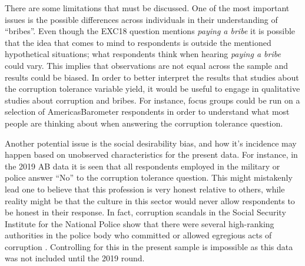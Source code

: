 \documentclass[12pt,a4]{article}\usepackage[]{graphicx}\usepackage[]{xcolor}
\begin{document}
There are some limitations that must be discussed. One of the most important issues is the possible differences across individuals in their understanding of \enquote{bribes}. Even though the EXC18 question mentions \textit{paying a bribe} it is possible that the idea that comes to mind to respondents is outside the mentioned hypothetical situations; what respondents think when hearing \textit{paying a bribe} could vary. This implies that observations are not equal across the sample and results could be biased. In order to better interpret the results that studies about the corruption tolerance variable yield, it would be useful to engage in qualitative studies about corruption and bribes. For instance, focus groups could be run on a selection of AmericasBarometer respondents in order to understand what most people are thinking about when answering the corruption tolerance question.

Another potential issue is the social desirability bias, and how it's incidence may happen based on unobserved characteristics for the present data. For instance, in the 2019 AB data it is seen that all respondents employed in the military or police answer \enquote{No} to the corruption tolerance question. This might mistakenly lead one to believe that this profession is very honest relative to others, while reality might be that the culture in this sector would never allow respondents to be honest in their response. In fact, corruption scandals in the Social Security Institute for the National Police show that there were several high-ranking authorities in the police body who committed or allowed egregious acts of corruption \parencite{Molina.2021}. Controlling for this in the present sample is impossible as this data was not included until the 2019 round.
\end{document}
